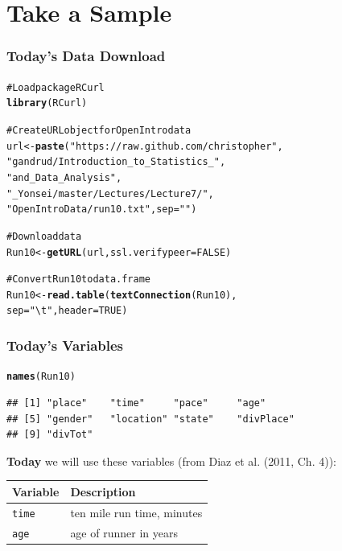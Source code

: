 \documentclass{beamer}\usepackage{graphicx, color}
\makeatletter
\newcommand{\hlfunctioncall}[1]{\textcolor[rgb]{0.501960784313725,0,0.329411764705882}{\textbf{#1}}}%
\newcommand{\hlstring}[1]{\textcolor[rgb]{0.6,0.6,1}{#1}}%
\newcommand{\hlcomment}[1]{\textcolor[rgb]{0.180392156862745,0.6,0.341176470588235}{#1}}%
\newenvironment{kframe}{%
 \def\at@end@of@kframe{}%
 \ifinner\ifhmode%
  \def\at@end@of@kframe{\end{minipage}}%
  \begin{minipage}{\columnwidth}%
 \fi\fi%
 \def\FrameCommand##1{\hskip\@totalleftmargin \hskip-\fboxsep
 \colorbox{shadecolor}{##1}\hskip-\fboxsep
     \hskip-\linewidth \hskip-\@totalleftmargin \hskip\columnwidth}%
 \MakeFramed {\advance\hsize-\width
   \@totalleftmargin\z@ \linewidth\hsize
   \@setminipage}}%
 {\par\unskip\endMakeFramed%
 \at@end@of@kframe}
\newenvironment{knitrout}{}{} %
\makeatother
\begin{document}
\section{Take a Sample}
\begin{frame}[fragile]
  \frametitle{Today's Data Download}
\begin{knitrout}
\color{fgcolor}\begin{kframe}
\begin{alltt}
\hlcomment{# Load package RCurl}
\hlfunctioncall{library}(RCurl)

\hlcomment{# Create URL object for OpenIntro data}
url <- \hlfunctioncall{paste}(\hlstring{"https://raw.github.com/christopher"},
             \hlstring{"gandrud/Introduction_to_Statistics_"},
             \hlstring{"and_Data_Analysis"},
             \hlstring{"_Yonsei/master/Lectures/Lecture7/"},
             \hlstring{"OpenIntroData/run10.txt"}, sep = \hlstring{""})

\hlcomment{# Download data}
Run10 <- \hlfunctioncall{getURL}(url, ssl.verifypeer = FALSE)

\hlcomment{# Convert Run10 to data.frame}
Run10 <- \hlfunctioncall{read.table}(\hlfunctioncall{textConnection}(Run10),
                    sep = \hlstring{"\textbackslash{}t"}, header = TRUE)
\end{alltt}
\end{kframe}
\end{knitrout}

\end{frame}

\begin{frame}[fragile]
  \frametitle{Today's Variables}
\begin{knitrout}
\color{fgcolor}\begin{kframe}
\begin{alltt}
\hlfunctioncall{names}(Run10)
\end{alltt}
\begin{verbatim}
## [1] "place"    "time"     "pace"     "age"     
## [5] "gender"   "location" "state"    "divPlace"
## [9] "divTot"
\end{verbatim}
\end{kframe}
\end{knitrout}


  {\bf{Today}} we will use these variables (from Diaz et al. (2011, Ch. 4)):
  \begin{table}
    \begin{tabular}{l p{4cm}}
      \hline
      Variable & Description \\[0.3cm] 
      \hline\hline
      \texttt{time} & ten mile run time, minutes \\
      \texttt{age} & age of runner in years \\
      \hline
    \end{tabular}
  \end{table}
\end{frame}
\end{document}
